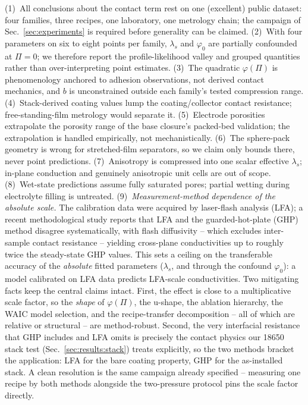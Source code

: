 \documentclass[10pt,a4paper]{article}
\newcommand{\lams}{\lambda_{s}}
\begin{document}
(1)~All conclusions about the contact term rest on one (excellent) public dataset: four families, three recipes, one laboratory, one metrology chain; the campaign of Sec.~\ref{sec:experiments} is required before generality can be claimed. (2)~With four parameters on six to eight points per family, $\lams$ and $\varphi_0$ are partially confounded at $\Pi=0$; we therefore report the profile-likelihood valley and grouped quantities rather than over-interpreting point estimates. (3)~The quadratic $\varphi(\Pi)$ is phenomenology anchored to adhesion observations, not derived contact mechanics, and $b$ is unconstrained outside each family's tested compression range. (4)~Stack-derived coating values lump the coating/collector contact resistance; free-standing-film metrology would separate it. (5)~Electrode porosities extrapolate the porosity range of the base closure's packed-bed validation; the extrapolation is handled empirically, not mechanistically. (6)~The sphere-pack geometry is wrong for stretched-film separators, so we claim only bounds there, never point predictions. (7)~Anisotropy is compressed into one scalar effective $\lams$; in-plane conduction and genuinely anisotropic unit cells are out of scope. (8)~Wet-state predictions assume fully saturated pores; partial wetting during electrolyte filling is untreated. (9)~\emph{Measurement-method dependence of the absolute scale.} The calibration data were acquired by laser-flash analysis (LFA); a recent methodological study \cite{gandert2025} reports that LFA and the guarded-hot-plate (GHP) method disagree systematically, with flash diffusivity -- which excludes inter-sample contact resistance -- yielding cross-plane conductivities up to roughly twice the steady-state GHP values. This sets a ceiling on the transferable accuracy of the \emph{absolute} fitted parameters ($\lams$, and through the confound $\varphi_0$): a model calibrated on LFA data predicts LFA-scale conductivities. Two mitigating facts keep the central claims intact. First, the effect is close to a multiplicative scale factor, so the \emph{shape} of $\varphi(\Pi)$, the u-shape, the ablation hierarchy, the WAIC model selection, and the recipe-transfer decomposition -- all of which are relative or structural -- are method-robust. Second, the very interfacial resistance that GHP includes and LFA omits is precisely the contact physics our 18650 stack test (Sec.~\ref{sec:results:stack}) treats explicitly, so the two methods bracket the application: LFA for the bare coating property, GHP for the as-installed stack. A clean resolution is the same campaign already specified -- measuring one recipe by both methods alongside the two-pressure protocol pins the scale factor directly.
\end{document}
